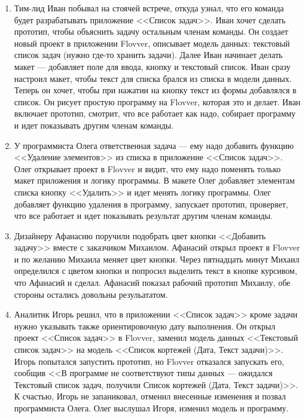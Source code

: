 \begin{enumerate}
    \item Тим-лид Иван побывал на стоячей встрече, откуда узнал, что его команда будет разрабатывать приложение <<Список задач>>.
	Иван хочет сделать прототип, чтобы объяснить задачу остальным членам команды.
    Он создает новый проект в приложении Flovver, описывает модель данных: текстовый список задач (нужно где-то хранить задачи). 
    Далее Иван начинает делать макет --- добавляет поле для ввода, кнопку и текстовый список.
    Иван сразу настроил макет, чтобы текст для списка брался из списка в модели данных.
    Теперь он хочет, чтобы при нажатии на кнопку текст из формы добавлялся в список. Он рисует простую программу на Flovver, которая это и делает.
    Иван включает прототип, смотрит, что все работает как надо, собирает программу и идет показывать другим членам команды.

    \item У программиста Олега ответственная задача --- ему надо добавить функцию <<Удаление элементов>> из списка в приложение <<Список задач>>.
	Олег открывает проект в Flovver и видит, что ему надо поменять только макет приложения и логику программы.
	В макете Олег добавляет элементам списка кнопку <<Удалить>> и идет менять логику программы. Олег добавляет функцию удаления в программу,
	запускает прототип, проверяет, что все работает и идет показывать результат другим членам команды.

    \item Дизайнеру Афанасию поручили подобрать цвет кнопки <<Добавить задачу>> вместе с заказчиком Михаилом.
	Афанасий открыл проект в Flovver и по желанию Михаила меняет цвет кнопки. Через пятнадцать минут Михаил
	определился с цветом кнопки и попросил выделить текст в кнопке курсивом, что Афанасий и сделал. Афанасий
	показал рабочий прототип Михаилу, обе стороны остались довольны резульататом.

    \item Аналитик Игорь решил, что в приложении <<Список задач>> кроме задачи нужно указывать также ориентировочную дату
	выполнения. Он открыл проект <<Список задач>> в Flovver, заменил модель данных <<Текстовый список задач>>
	на модель <<Список кортежей (Дата, Текст задачи)>>. Игорь попытался запустить прототип, но Flovver отказался запускать его,
	сообщив <<В программе не соответствуют типы данных --- ожидался Текстовый список задач, получили Список кортежей (Дата, Текст задачи)>>.
	К счастью, Игорь не запаниковал, отменил внесенные изменения и позвал программиста Олега.
	Олег выслушал Игоря, изменил модель и программу.
\end{enumerate}

